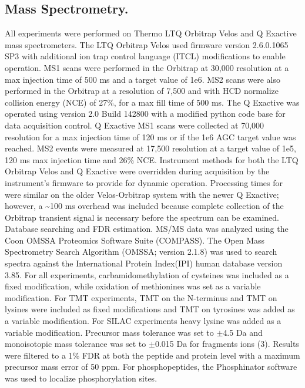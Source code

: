 \subsection{Mass Spectrometry.}
All experiments were performed on Thermo LTQ Orbitrap Velos and Q Exactive mass spectrometers. The LTQ Orbitrap Velos used firmware version 2.6.0.1065 SP3 with additional ion trap control language (ITCL) modifications to enable \inseq{} operation. MS1 scans were performed in the Orbitrap at 30,000 resolution at a max injection time of 500 ms and a target value of 1e6. MS2 scans were also performed in the Orbitrap at a resolution of 7,500 and with HCD normalize collision energy (NCE) of 27\%, for a max fill time of 500 ms. The Q Exactive was operated using version 2.0 Build 142800 with a modified python code base for \inseq{} data acquisition control. Q Exactive MS1 scans were collected at 70,000 resolution for a max injection time of 120 ms or if the 1e6 AGC target value was reached. MS2 events were measured at 17,500 resolution at a target value of 1e5, 120 ms max injection time and 26\% NCE. Instrument methods for both the LTQ Orbitrap Velos and Q Exactive were overridden during acquisition by the instrument's firmware to provide for dynamic \inseq{} operation. Processing times for \inseq{} were similar on the older Velos-Orbitrap system with the newer Q Exactive; however, a \textasciitilde100 ms overhead was included because complete collection of the Orbitrap transient signal is necessary before the spectrum can be examined.
Database searching and FDR estimation. MS/MS data was analyzed using the Coon OMSSA Proteomics Software Suite (COMPASS).\cite{compass} The Open Mass Spectrometry Search Algorithm (OMSSA; version 2.1.8) was used to search spectra against the International Protein Index(IPI) human database version 3.85.\cite{omssa} For all experiments, carbamidomethylation of cysteines was included as a fixed modification, while oxidation of methionines was set as a variable modification. For TMT experiments, TMT on the N-terminus and TMT on lysines were included as fixed modifications and TMT on tyrosines was added as a variable modification. For SILAC experiments heavy lysine was added as a variable modification. Precursor mass tolerance was set to $\pm$4.5 Da and monoisotopic mass tolerance was set to $\pm$0.015 Da for fragments ions (3). Results were filtered to a 1\% FDR at both the peptide and protein level with a maximum precursor mass error of 50 ppm. For phosphopeptides, the Phosphinator software was used to localize phosphorylation sites.\cite{esips}

